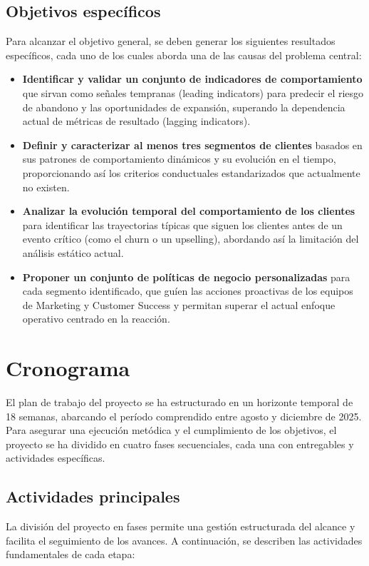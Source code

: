 \subsection{Objetivos específicos}

Para alcanzar el objetivo general, se deben generar los siguientes resultados específicos, cada uno de los cuales aborda una de las causas del problema central:

\begin{itemize}
    \item \textbf{Identificar y validar un conjunto de indicadores de comportamiento} que sirvan como señales tempranas (leading indicators) para predecir el riesgo de abandono y las oportunidades de expansión, superando la dependencia actual de métricas de resultado (lagging indicators).

    \item \textbf{Definir y caracterizar al menos tres segmentos de clientes} basados en sus patrones de comportamiento dinámicos y su evolución en el tiempo, proporcionando así los criterios conductuales estandarizados que actualmente no existen.

    \item \textbf{Analizar la evolución temporal del comportamiento de los clientes} para identificar las trayectorias típicas que siguen los clientes antes de un evento crítico (como el churn o un upselling), abordando así la limitación del análisis estático actual.
    
    \item \textbf{Proponer un conjunto de políticas de negocio personalizadas} para cada segmento identificado, que guíen las acciones proactivas de los equipos de Marketing y Customer Success y permitan superar el actual enfoque operativo centrado en la reacción.
\end{itemize}

\section{Cronograma}
El plan de trabajo del proyecto se ha estructurado en un horizonte temporal de 18 semanas, abarcando el período comprendido entre agosto y diciembre de 2025. Para asegurar una ejecución metódica y el cumplimiento de los objetivos, el proyecto se ha dividido en cuatro fases secuenciales, cada una con entregables y actividades específicas.

\subsection{Actividades principales} %
La división del proyecto en fases permite una gestión estructurada del alcance y facilita el seguimiento de los avances. A continuación, se describen las actividades fundamentales de cada etapa:


